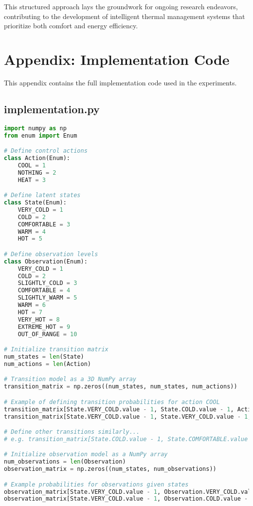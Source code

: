 \documentclass[11pt,a4paper]{article}
\begin{document}
This structured approach lays the groundwork for ongoing research endeavors, contributing to the development of intelligent thermal management systems that prioritize both comfort and energy efficiency.
\section{Appendix: Implementation Code}

This appendix contains the full implementation code used in the experiments.


\subsection{implementation.py}

\begin{lstlisting}[language=Python, caption={Full implementation code}]
import numpy as np
from enum import Enum

# Define control actions
class Action(Enum):
    COOL = 1
    NOTHING = 2
    HEAT = 3

# Define latent states
class State(Enum):
    VERY_COLD = 1
    COLD = 2
    COMFORTABLE = 3
    WARM = 4
    HOT = 5

# Define observation levels
class Observation(Enum):
    VERY_COLD = 1
    COLD = 2
    SLIGHTLY_COLD = 3
    COMFORTABLE = 4
    SLIGHTLY_WARM = 5
    WARM = 6
    HOT = 7
    VERY_HOT = 8
    EXTREME_HOT = 9
    OUT_OF_RANGE = 10

# Initialize transition matrix
num_states = len(State)
num_actions = len(Action)

# Transition model as a 3D NumPy array
transition_matrix = np.zeros((num_states, num_states, num_actions))

# Example of defining transition probabilities for action COOL
transition_matrix[State.VERY_COLD.value - 1, State.COLD.value - 1, Action.COOL.value - 1] = 0.8
transition_matrix[State.VERY_COLD.value - 1, State.VERY_COLD.value - 1, Action.COOL.value - 1] = 0.2

# Define other transitions similarly...
# e.g. transition_matrix[State.COLD.value - 1, State.COMFORTABLE.value - 1, Action.NOTHING.value - 1] = 0.7

# Initialize observation model as a NumPy array
num_observations = len(Observation)
observation_matrix = np.zeros((num_states, num_observations))

# Example probabilities for observations given states
observation_matrix[State.VERY_COLD.value - 1, Observation.VERY_COLD.value - 1] = 0.9
observation_matrix[State.VERY_COLD.value - 1, Observation.COLD.value - 1] = 0.1


\end{lstlisting}
\end{document}
